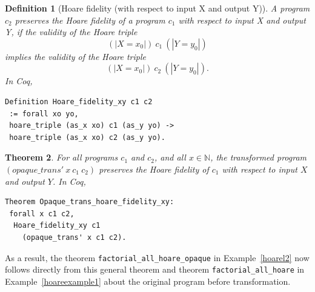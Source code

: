 \documentclass[compsoc,conference,a4paper,10pt,times]{IEEEtran}
\newtheorem{theorem}{Theorem}[section]
\newtheorem{defin}[theorem]{Definition}
\begin{document}
\begin{defin}[Hoare fidelity (with respect to input X and output Y)]
A program $c_2$ preserves the Hoare fidelity of a program $c_1$ with respect to input X and output Y, if the validity of the Hoare triple
\[
(| X = x_0 |)\ c_1\ (| Y = y_0 |)
\]
implies the validity of the Hoare triple
\[
(| X = x_0 |)\ c_2\ (| Y = y_0 |).
\]
In Coq,
\begin{verbatim}
Definition Hoare_fidelity_xy c1 c2 
 := forall xo yo,
 hoare_triple (as_x xo) c1 (as_y yo) -> 
 hoare_triple (as_x xo) c2 (as_y yo).\end{verbatim}
\end{defin}
%
%
\begin{theorem}\label{hoare_xy_main}
For all programs $c_1$ and $c_2$, and all $x \in \mathbb{N}$, the transformed program $(opaque\_trans'\ x\ c_1\ c_2)$ preserves the Hoare fidelity of $c_1$ with respect to input $X$ and output $Y$.
In Coq, \begin{verbatim}
Theorem Opaque_trans_hoare_fidelity_xy: 
 forall x c1 c2,
  Hoare_fidelity_xy c1 
    (opaque_trans' x c1 c2).
\end{verbatim}
\end{theorem}
As a result, the theorem \texttt{factorial\_\-all\_\-hoare\_\-opaque} in Example~\ref{hoarel2} now follows directly from this general theorem and theorem \texttt{factorial\_all\_hoare} in Example~\ref{hoareexample1} about the original program before transformation.


%
\end{document}
